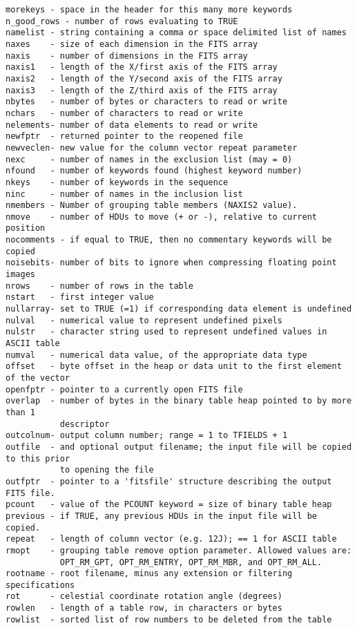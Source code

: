 \documentclass[11pt]{book}
\begin{document}
\begin{verbatim}
morekeys - space in the header for this many more keywords
n_good_rows - number of rows evaluating to TRUE
namelist - string containing a comma or space delimited list of names
naxes    - size of each dimension in the FITS array
naxis    - number of dimensions in the FITS array
naxis1   - length of the X/first axis of the FITS array
naxis2   - length of the Y/second axis of the FITS array
naxis3   - length of the Z/third axis of the FITS array
nbytes   - number of bytes or characters to read or write
nchars   - number of characters to read or write
nelements- number of data elements to read or write
newfptr  - returned pointer to the reopened file
newveclen- new value for the column vector repeat parameter
nexc     - number of names in the exclusion list (may = 0)
nfound   - number of keywords found (highest keyword number)
nkeys    - number of keywords in the sequence
ninc     - number of names in the inclusion list
nmembers - Number of grouping table members (NAXIS2 value).
nmove    - number of HDUs to move (+ or -), relative to current position
nocomments - if equal to TRUE, then no commentary keywords will be copied
noisebits- number of bits to ignore when compressing floating point images
nrows    - number of rows in the table
nstart   - first integer value
nullarray- set to TRUE (=1) if corresponding data element is undefined
nulval   - numerical value to represent undefined pixels
nulstr   - character string used to represent undefined values in ASCII table
numval   - numerical data value, of the appropriate data type
offset   - byte offset in the heap or data unit to the first element of the vector
openfptr - pointer to a currently open FITS file
overlap  - number of bytes in the binary table heap pointed to by more than 1
           descriptor
outcolnum- output column number; range = 1 to TFIELDS + 1
outfile  - and optional output filename; the input file will be copied to this prior
           to opening the file
outfptr  - pointer to a 'fitsfile' structure describing the output FITS file.
pcount   - value of the PCOUNT keyword = size of binary table heap
previous - if TRUE, any previous HDUs in the input file will be copied.
repeat   - length of column vector (e.g. 12J); == 1 for ASCII table
rmopt    - grouping table remove option parameter. Allowed values are:
           OPT_RM_GPT, OPT_RM_ENTRY, OPT_RM_MBR, and OPT_RM_ALL.
rootname - root filename, minus any extension or filtering specifications
rot      - celestial coordinate rotation angle (degrees)
rowlen   - length of a table row, in characters or bytes
rowlist  - sorted list of row numbers to be deleted from the table

\end{verbatim}
\end{document}
